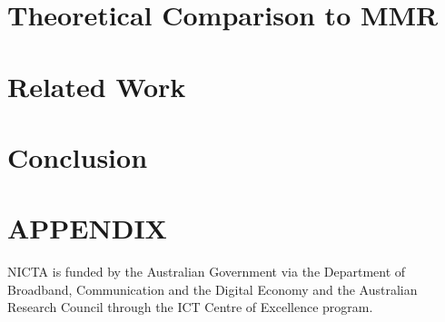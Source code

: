 \documentclass[prodmode,acmtecs]{acmsmall}
\begin{document}
\section{Theoretical Comparison to MMR}
\label{sec:theory}


%

\section{Related Work}
\label{sec:related_work}


\section{Conclusion}
\label{sec:conclusion}




\appendix
\section*{APPENDIX}


\begin{acks}
NICTA is funded by the Australian Government via 
the Department of Broadband, Communication and the Digital
Economy and the Australian Research Council through the ICT
Centre of Excellence program.
\end{acks}





%
%
%
\end{document}
